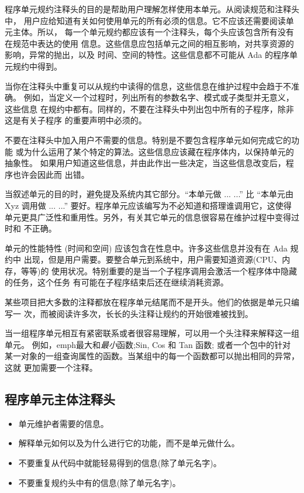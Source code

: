 \begin{blockindent}
程序单元规约注释头的目的是帮助用户理解怎样使用本单元。从阅读规范和注释头中，
用户应给知道有关如何使用单元的所有必须的信息。它不应该还需要阅读单元主体。所以，
每一个单元规约都应该有一个注释头，每个头应该包含所有没有在规范中表达的使用
信息。这些信息应包括单元之间的相互影响，对共享资源的影响，异常的抛出，以及
时间、空间的特性。这些信息都不可能从 Ada 的程序单元规约中得到。

当你在注释头中重复可以从规约中读得的信息，这些信息在维护过程中会趋于不准确。
例如，当定义一个过程时，列出所有的参数名字、模式或子类型并无意义，这些信息
在规约中都有。同样的，不要在注释头中列出包中所有的子程序，除非这是有关子程序
的重要声明中必须的。

不要在注释头中加入用户不需要的信息。特别是不要包含程序单元如何完成它的功能
或为什么运用了某个特定的算法。这些信息应该藏在程序体内，以保持单元的抽象性。
如果用户知道这些信息，并由此作出一些决定，当这些信息改变后，程序也许会因此而
出错。

当叙述单元的目的时，避免提及系统内其它部分。``本单元做 ... ...'' 比 ``本单元由
Xyz 调用做 ... ...'' 要好。程序单元应该编写为不必知道和搭理谁调用它，这使得
单元更具广泛性和重用性。另外，有关其它单元的信息很容易在维护过程中变得过时和
不正确。

单元的性能特性 (时间和空间) 应该包含在性息中。许多这些信息并没有在 Ada 规约中
出现，但是用户需要。要整合单元到系统中，用户需要知道资源(CPU、内存，等等)的
使用状况。特别重要的是当一个子程序调用会激活一个程序体中隐藏的任务，这个任务
有可能在子程序结束后还在继续消耗资源。
\end{blockindent}

\begin{blockindent}
某些项目把大多数的注释都放在程序单元结尾而不是开头。他们的依据是单元只编写一
次，而被阅读许多次，长长的头注释让规约的开始很难被找到。
\end{blockindent}

\begin{blockindent}
当一组程序单元相互有紧密联系或者很容易理解，可以用一个头注释来解释这一组单元。
例如，emph{最大}和\emph{最小}函数;Sin, Cos 和 Tan 函数; 或者一个包中的针对
某一对象的一组查询属性的函数。当某组中的每一个函数都可以抛出相同的异常，这就
更加需要一个注释。
\end{blockindent}

\subsection{程序单元主体注释头}
\begin{itemize}
    \item 单元维护者需要的信息。
    \item 解释单元如何以及为什么进行它的功能，而不是单元做什么。
    \item 不要重复从代码中就能轻易得到的信息(除了单元名字)。
    \item 不要重复规约头中有的信息(除了单元名字)。
\end{itemize}


